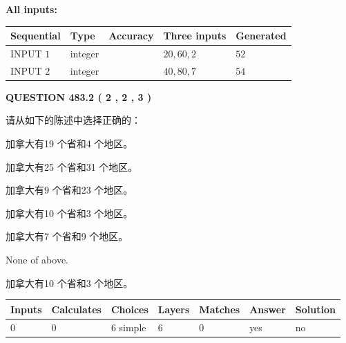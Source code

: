 \documentclass{ctexart}
\begin{document}
   
   
   
\noindent\vspace{0.1in}\hspace{-0.08in} {\textbf{\Large{All inputs: }}}
   
   
  
  
\noindent\begin{tabular}{|l|l|l|l|l|}
\hline
 Sequential & Type & Accuracy & Three inputs & Generated \\ 
\hline
 
 
  INPUT $  1 $ & integer &  & $
 20
 , 
 60
 , 
 2
 $ & $ 52 $ 
 \\  \hline  
 
 
  INPUT $  2 $ & integer &  & $
 40
 , 
 80
 , 
 7
 $ & $ 54 $ 
 \\  \hline  
 \end{tabular}
   
   
  
\vspace{0.2in}
  
{\textbf{\Large{QUESTION
483.2 
 ( 2 , 2 , 3 )
}}}
  
  
请从如下的陈述中选择正确的：
 
 
加拿大有19 个省和4 个地区。
 
 
加拿大有25 个省和31 个地区。
 
 
加拿大有9 个省和23 个地区。
 
 
加拿大有10 个省和3 个地区。
 
 
加拿大有7 个省和9 个地区。
 
 
 None of above.
 
 
\noindent{}
 
 
加拿大有10 个省和3 个地区。
 
 
\noindent{}
 
 
   
   
   
   
\noindent\begin{tabular}{|l|l|l|l|l|l|l|}
 \hline
Inputs & Calculates & Choices & Layers & Matches & Answer & Solution \\ \hline
 0  & 
 0  & 
 6
  simple  
  & 
 6  & 
 0  & 
  yes & 
  no 
  \\ \hline
 \end{tabular}
   
\end{document}
